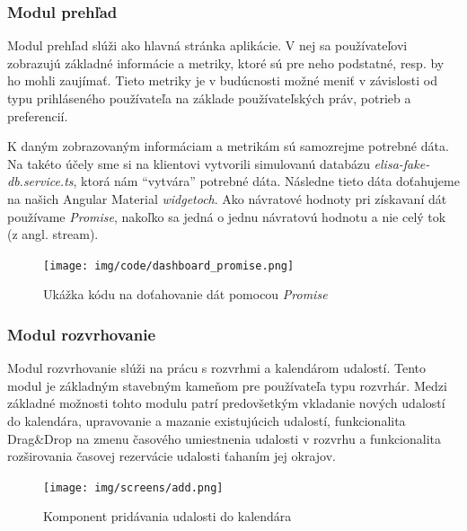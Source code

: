 \subsubsection{Modul prehľad}
\label{subsubsec:dashboard_module}

Modul prehľad slúži ako hlavná stránka aplikácie. V nej sa používateľovi zobrazujú základné
informácie a metriky, ktoré sú pre neho podstatné, resp. by ho mohli zaujímať. Tieto metriky
je v budúcnosti možné meniť v závislosti od typu prihláseného používateľa na základe
používateľských práv, potrieb a preferencií.

K daným zobrazovaným informáciam a metrikám sú samozrejme potrebné dáta. Na takéto účely
sme si na klientovi vytvorili simulovanú databázu \textit{elisa-fake-db.service.ts}, ktorá nám
``vytvára'' potrebné dáta. Následne tieto dáta doťahujeme na našich Angular Material
\textit{widgetoch}. Ako návratové hodnoty pri získavaní dát používame \textit{Promise}, nakoľko
sa jedná o jednu návratovú hodnotu a nie celý tok (z angl. stream).

\begin{figure}[ht]
  \centering
  \texttt{[image: img/code/dashboard\_promise.png]}
  \caption{\label{fig:dashboard_promise} Ukážka kódu na doťahovanie dát pomocou \textit{Promise}}
\end{figure}
\newpage
\subsubsection{Modul rozvrhovanie}
\label{subsubsec:scheduling_module}

Modul rozvrhovanie slúži na prácu s rozvrhmi a kalendárom udalostí. Tento modul
je základným stavebným kameňom pre používateľa typu rozvrhár. Medzi základné
možnosti tohto modulu patrí predovšetkým vkladanie nových udalostí do kalendára,
upravovanie a mazanie existujúcich udalostí,
funkcionalita Drag\&Drop na zmenu časového umiestnenia udalosti v rozvrhu
a funkcionalita rozširovania časovej rezervácie udalosti ťahaním jej okrajov.

\newpage
\begin{figure}[ht]
  \centering
  \texttt{[image: img/screens/add.png]}
  \caption{\label{fig:add} Komponent pridávania udalosti do kalendára}
\end{figure}

